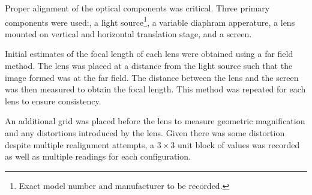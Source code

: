 \documentclass[aip, cp, amsmath, amssymb, reprint, nofootinbib]{revtex4-2}
\begin{document}
        Proper alignment of the optical components was critical. Three primary components were used:, a light source\footnote{Exact model number and manufacturer to be recorded.}, a variable diaphram apperature, a lens mounted on vertical and horizontal translation stage, and a screen.

        Initial estimates of the focal length of each lens were obtained using a far field method. The lens was placed at a distance from the light source such that the image formed was at the far field. The distance between the lens and the screen was then measured to obtain the focal length. This method was repeated for each lens to ensure consistency.


        An additional grid was placed before the lens to measure geometric magnification and any distortions introduced by the lens. Given there was some distortion despite multiple realignment attempts, a $3\times3$ unit block of values was recorded as well as multiple readings for each configuration.

\end{document}
